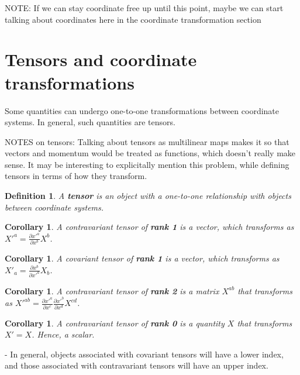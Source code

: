 \documentclass{book}
\newtheorem{defn}[equation]{Definition}
\newtheorem{coro}[equation]{Corollary}
\begin{document}
NOTE: If we can stay coordinate free up until this point, maybe we can start talking about coordinates here in the coordinate transformation section
\section{Tensors and coordinate transformations}
Some quantities can undergo one-to-one transformations between coordinate systems. In general, such quantities are tensors. 

NOTES on tensors: Talking about tensors as multilinear maps makes it so that vectors and momentum would be treated as functions, which doesn't really make sense. It may be interesting to explicitally mention this problem, while defining tensors in terms of how they transform. 


\begin{defn}
	A \textbf{tensor} is an object with a one-to-one relationship with objects between coordinate systems. 
\end{defn}

\begin{coro}
	A contravariant tensor of \textbf{rank 1} is a vector, which transforms as  $X'^a = \frac{\partial x'^a}{\partial x^b} X^b$.  
\end{coro}

\begin{coro}
	A covariant tensor of \textbf{rank 1} is a vector, which transforms as $X'_a = \frac{\partial x^b}{\partial x'^a} X_b$. 
\end{coro}

\begin{coro}
	A contravariant tensor of \textbf{rank 2} is a matrix $X^{ab}$ that transforms as $X'^{ab} = \frac{\partial x'^a}{\partial x^c} \frac{\partial x'^b}{\partial x^d} X^{cd}$. 
\end{coro}

\begin{coro}
	A contravariant tensor of \textbf{rank 0} is a quantity $X$ that transforms $X' = X$. Hence, a scalar. 
\end{coro}

- In general, objects associated with covariant tensors will have a lower index, and those associated with contravariant tensors will have an upper index. 
\end{document}
